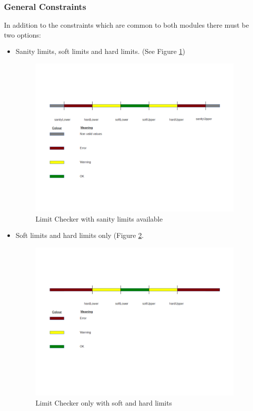 \subsubsection{General Constraints}

In addition to the constraints which are common to both modules there must be two options:

\begin{itemize}
\item Sanity limits, soft limits and hard limits. (See Figure \ref{f4.2})
\begin{figure}[H]
\centerline{\includegraphics[width=1.2\textwidth]{images/LimitChecking1.png}}
\caption{Limit Checker with sanity limits available}
\label{f4.2}
\end{figure}
\pagebreak
\item Soft limits and hard limits only (Figure \ref{f4.3}.
\begin{figure}[H]
\centerline{\includegraphics[width=1.2\textwidth]{images/LimitChecking2.png}}
\caption{Limit Checker only with soft and hard limits}
\label{f4.3}
\end{figure}
\end{itemize}

